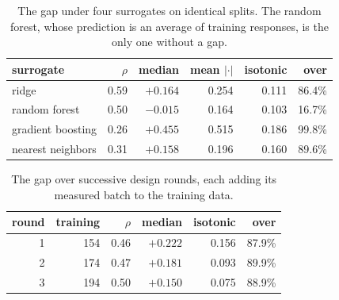\documentclass{article}
\theoremstyle{plain}
\theoremstyle{definition}
\begin{document}
\begin{table}[ht]
\caption{The gap under four surrogates on identical splits. The random forest, whose
prediction is an average of training responses, is the only one without a gap.}
\label{tab:surrogates}
\vskip 0.1in
\begin{center}
\begin{small}
\begin{tabular}{lrrrrr}
\toprule
surrogate & $\rho$ & median & mean $|\cdot|$ & isotonic & over \\
\midrule
ridge             & 0.59 & $+0.164$ & 0.254 & 0.111 & 86.4\% \\
random forest     & 0.50 & $-0.015$ & 0.164 & 0.103 & 16.7\% \\
gradient boosting & 0.26 & $+0.455$ & 0.515 & 0.186 & 99.8\% \\
nearest neighbors & 0.31 & $+0.158$ & 0.196 & 0.160 & 89.6\% \\
\bottomrule
\end{tabular}
\end{small}
\end{center}
\vskip -0.1in
\end{table}

\begin{table}[ht]
\caption{The gap over successive design rounds, each adding its measured batch to the
training data.}
\label{tab:rounds}
\vskip 0.1in
\begin{center}
\begin{small}
\begin{tabular}{rrrrrr}
\toprule
round & training & $\rho$ & median & isotonic & over \\
\midrule
1 & 154 & 0.46 & $+0.222$ & 0.156 & 87.9\% \\
2 & 174 & 0.47 & $+0.181$ & 0.093 & 89.9\% \\
3 & 194 & 0.50 & $+0.150$ & 0.075 & 88.9\% \\
\bottomrule
\end{tabular}
\end{small}
\end{center}
\vskip -0.1in
\end{table}
\end{document}
